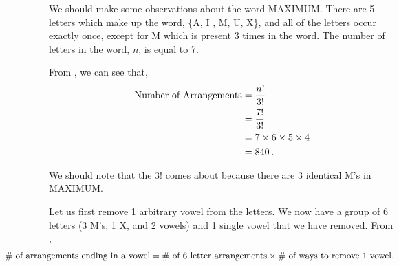 %
%


\begin{subquestions}
	
\subquestion

We should make some observations about the word MAXIMUM. There are 5 letters which make up the word, \{A, I , M, U, X\}, and all of the letters occur exactly once, except for M which is present 3 times in the word. The number of letters in the word, $n$, is equal to 7.
	
\begin{subsubquestions}
	
\subsubquestion

From , we can see that,
\begin{align}
	\text{Number of Arrangements} & = \frac{n!}{3!} \nonumber \\
	                              & = \frac{7!}{3!} \nonumber \\
	                              & = 7 \times 6 \times 5 \times 4 \nonumber \\
	                              & = 840 \,.
\end{align}	
	
We should note that the $3!$ comes about because there are 3 identical M's in MAXIMUM.


\subsubquestion

Let us first remove 1 arbitrary vowel from the letters.
We now have a group of 6 letters (3 M's, 1 X, and 2 vowels) and 1 single vowel that we have removed. From ,
\begin{align}
	\hspace{-50pt}
	\text{$\#$ of arrangements ending in a vowel} = \text{$\#$ of 6 letter arrangements} \times \text{$\#$ of ways to remove 1 vowel}. \label{2011:q3:NoVowel}
\end{align}


\end{subsubquestions}
\end{subquestions}
